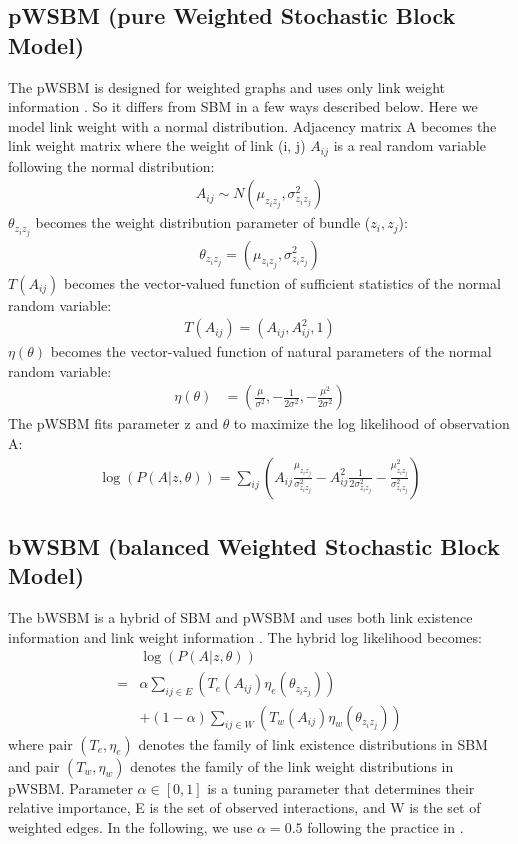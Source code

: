 \documentclass[12pt]{WSUThesis}
\theoremstyle{definition}
\begin{document}
\subsection{pWSBM (pure Weighted Stochastic Block Model)}
The pWSBM is designed for weighted graphs and uses only link weight information \cite{aicher2014learning}.
So it differs from SBM in a few ways described below.
Here we model link weight with a normal distribution.
Adjacency matrix A becomes the link weight matrix where the weight of link (i, j)  $ A_{ij} $ is a real random variable following the normal distribution:
\begin{align*}
A_{ij} \sim N(\mu_{z_i z_j}, \sigma_{z_i z_j}^2)
\end{align*}
$ \theta_{z_i z_j} $ becomes the weight distribution parameter of bundle ($z_i, z_j$):
\begin{align*}
\theta_{z_i z_j} = (\mu_{z_i z_j}, \sigma_{z_i z_j}^2)
\end{align*}
$ T(A_{ij}) $ becomes the vector-valued function of sufficient statistics of the normal random variable:
\begin{align*}
T(A_{ij}) = (A_{ij}, A_{ij}^2, 1)
\end{align*}
$ \eta(\theta) $ becomes the vector-valued function of natural parameters of the normal random variable:
\begin{align*}
\eta(\theta)
&= (\frac{\mu}{\sigma^2}, -\frac{1}{2\sigma^2}, -\frac{\mu^2}{2\sigma^2})
\end{align*}
The pWSBM fits parameter z and $ \theta $
to maximize the log likelihood of observation A:
\begin{align*}
\log(P(A|z, \theta))
= \sum_{ij} (
A_{ij} \frac{\mu_{z_i z_j}}{\sigma_{z_i z_j}^2}
- A_{ij}^2 \frac{1}{2\sigma_{z_i z_j}^2}
- \frac{\mu_{z_i z_j}^2}{\sigma_{z_i z_j}^2}
)
\end{align*}

\subsection{bWSBM (balanced Weighted Stochastic Block Model)}
The bWSBM is a hybrid of SBM and pWSBM
and uses both link existence information and link weight information \cite{aicher2014learning}.
The hybrid log likelihood becomes:
\begin{align*}
&\log(P(A|z, \theta))\\
=& \alpha \sum_{ij \in E} (T_e(A_{ij}) \eta_e(\theta_{z_i z_j}))\\
& + (1 - \alpha) \sum_{ij \in W} (T_w(A_{ij}) \eta_w(\theta_{z_i z_j}))
\end{align*}
where pair $ (T_e, \eta_e) $ denotes the family of link existence distributions in SBM
and pair $ (T_w, \eta_w) $ denotes the family of the link weight distributions in pWSBM.
Parameter $ \alpha \in [0, 1]$ is a tuning parameter that determines their relative importance,
E is the set of observed interactions,
and W is the set of weighted edges.
In the following, we use $ \alpha = 0.5 $ following the practice in \cite{aicher2014learning}.
\end{document}
